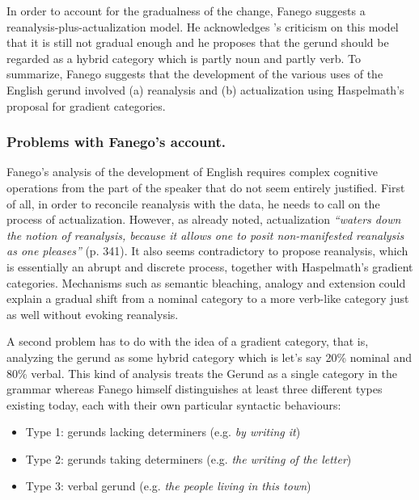 In order to account for the gradualness of the change, Fanego suggests a reanalysis-plus-actualization model. He acknowledges \citet{haspelmath98does}'s criticism on this model that it is still not gradual enough and he proposes that the gerund should be regarded as a hybrid category which is partly noun and partly verb. To summarize, Fanego suggests that the development of the various uses of the English gerund involved (a) reanalysis and (b) actualization using Haspelmath's proposal for gradient categories. 


\subsubsection{Problems with Fanego's account.} 
Fanego's analysis of the development of English requires complex cognitive operations from the part of the speaker that do not seem entirely justified. First of all, in order to reconcile reanalysis with the data, he needs to call on the process of actualization. However, as \citet{haspelmath98does} already noted, actualization {\em ``waters down the notion of reanalysis, because it allows one to posit non-manifested reanalysis as one pleases''} (p. 341). It also seems contradictory to propose reanalysis, which is essentially an abrupt and discrete process, together with Haspelmath's gradient categories. Mechanisms such as semantic bleaching, analogy and extension could explain a gradual shift from a nominal category to a more verb-like category just as well without evoking reanalysis.

A second problem has to do with the idea of a gradient category, that is, analyzing the gerund as some hybrid category which is let's say 20\% nominal and 80\% verbal. This kind of analysis treats the Gerund as a single category in the grammar whereas Fanego himself distinguishes at least three different types existing today, each with their own particular syntactic behaviours:

\begin{itemize}
\item Type 1: gerunds lacking determiners (e.g. {\em by writing it})
\item Type 2: gerunds taking determiners (e.g. {\em the writing of the letter})
\item Type 3: verbal gerund (e.g. {\em the people living in this town})
\end{itemize}

